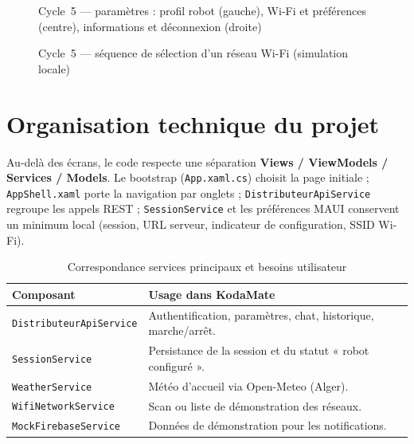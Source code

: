 \documentclass[a4paper,12pt]{report}
\begin{document}
	\begin{figure}[H]
		\centering
		\caption{Cycle~5 --- paramètres : profil robot (gauche), Wi-Fi et préférences
			(centre), informations et déconnexion (droite)}
		\label{fig:ch5-ecran-settings}
	\end{figure}
	
	\begin{figure}[H]
		\centering
		\caption{Cycle~5 --- séquence de sélection d'un réseau Wi-Fi (simulation locale)}
		\label{fig:ch5-seq-wifi}
	\end{figure}
	
	\section{Organisation technique du projet}
	
	Au-delà des écrans, le code respecte une séparation \textbf{Views /
	ViewModels / Services / Models}. Le bootstrap (\texttt{App.xaml.cs}) choisit la
	page initiale ; \texttt{AppShell.xaml} porte la navigation par onglets ;
	\texttt{DistributeurApiService} regroupe les appels REST ; \texttt{SessionService}
	et les préférences MAUI conservent un minimum local (session, URL serveur,
	indicateur de configuration, SSID Wi-Fi).
	
	\begin{table}[H]
		\centering
		\caption{Correspondance services principaux et besoins utilisateur}
		\label{tab:ch5-code-architecture}
		\renewcommand{\arraystretch}{1.25}
		\begin{tabularx}{\textwidth}{|>{\raggedright\arraybackslash}p{4.2cm}|>{\raggedright\arraybackslash}X|}
			\hline
			\textbf{Composant} & \textbf{Usage dans KodaMate} \\
			\hline
			\texttt{DistributeurApiService} & Authentification, paramètres, chat, historique, marche/arrêt. \\
			\hline
			\texttt{SessionService} & Persistance de la session et du statut « robot configuré ». \\
			\hline
			\texttt{WeatherService} & Météo d'accueil via Open-Meteo (Alger). \\
			\hline
			\texttt{WifiNetworkService} & Scan ou liste de démonstration des réseaux. \\
			\hline
			\texttt{MockFirebaseService} & Données de démonstration pour les notifications. \\
			\hline
		\end{tabularx}
	\end{table}
	
\end{document}
